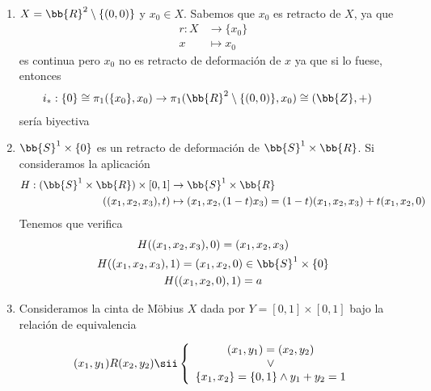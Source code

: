 \begin{ejemplo}\
    \begin{enumerate}
        \item $X=\bb{R}^2\setminus \{(0,0)\}$ y $x_0\in X$. Sabemos que $x_0$ es retracto de $X$, ya que
        \begin{align*}
            r:X &\to \{x_0\}\\
            x & \mapsto x_0
        \end{align*}
        es continua pero $x_0$ no es retracto de deformación de $x$ ya que si lo fuese, entonces
        \begin{align*}
            i_*: \{0\} \cong \pi_1(\{x_0\},x_0) &\to \pi_1(\bb{R}^2\setminus\{(0,0)\}, x_0) \cong (\bb{Z}, +)
        \end{align*}
        sería biyectiva

        \item $\bb{S}^1 \times \{0\}$ es un retracto de deformación de $\bb{S}^1 \times \bb{R}$. Si consideramos la aplicación
        \begin{align*}
            H: (\bb{S}^1 \times \bb{R}) \times [0,1] &\to \bb{S}^1 \times \bb{R}\\
            ((x_1,x_2,x_3),t) & \mapsto (x_1,x_2, (1-t)x_3) = (1-t)(x_1,x_2,x_3) + t(x_1,x_2,0)
        \end{align*}
        Tenemos que verifica 
        \begin{gather*}
            H((x_1,x_2,x_3),0) = (x_1,x_2,x_3)\\
            H((x_1,x_2,x_3),1) = (x_1,x_2,0)\in \bb{S}^1\times \{0\}\\
            H((x_1,x_2,0),1) = a \\
        \end{gather*}

        \item Consideramos la cinta de Möbius $X$ dada por $Y=[0,1]\times [0,1]$ bajo la relación de equivalencia
        
        \begin{gather*}
            (x_1,y_1)R(x_2,y_2) \sii \left\{
                \begin{array}{c}
                    (x_1,y_1) = (x_2,y_2)\\
                    \vee\\ 
                    \{x_1,x_2\} = \{0,1\} \wedge y_1+y_2=1
                \end{array}
            \right.
        \end{gather*}


\end{enumerate}
\end{ejemplo}
